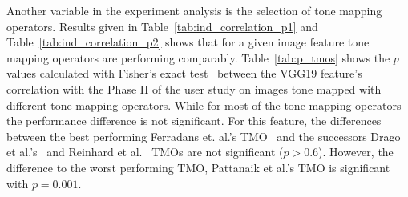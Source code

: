 \begin{table}
\caption{$p$ values for statistical significance between individual image features, calculated with Fisher's exact test.}
\label{tab:p_individual}
\centering
{}
\end{table}

Another variable in the experiment analysis is the selection of tone mapping operators. Results given in Table~\ref{tab:ind_correlation_p1} and Table~\ref{tab:ind_correlation_p2} shows that for a given image feature tone mapping operators are performing comparably. Table~\ref{tab:p_tmos} shows the $p$ values calculated with Fisher's exact test~\cite{fisher1922interpretation} between the VGG19 feature's correlation with the Phase II of the user study on images tone mapped with different tone mapping operators. While for most of the tone mapping operators the performance difference is not significant. For this feature, the differences between the best performing Ferradans et. al.'s TMO~\cite{ferradans2011analysis} and the successors Drago et al.'s~\cite{drago2003adaptive} and Reinhard et al.~\cite{reinhard2002photographic} TMOs are not significant ($p > 0.6$). However, the difference to the worst performing TMO, Pattanaik et al.'s TMO is significant with $p=0.001$.

